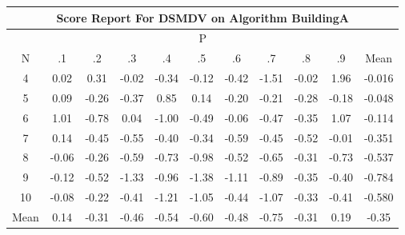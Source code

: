 \documentclass[11pt,a4paper]{report}
\begin{document}
\begin{longtable}{ | c || c | c | c | c | c | c | c | c | c || c |}
\hline
\multicolumn{11}{|c|}{ Score Report For DSMDV on Algorithm BuildingA} \\
\hline
\multicolumn{11}{|c|}{ P } \\
\hline
N & .1 & .2 & .3 & .4 & .5 & .6 & .7 & .8 & .9 & Mean\\
 \hline
 \hline
 \endhead
  4 &  \cellcolor[HTML]{FFFFFF} 0.02 &  \cellcolor[HTML]{F7F7FF} 0.31 &  \cellcolor[HTML]{FFFFFF} -0.02 &  \cellcolor[HTML]{FFF7F7} -0.34 &  \cellcolor[HTML]{FFFFFF} -0.12 &  \cellcolor[HTML]{FFF7F7} -0.42 &  \cellcolor[HTML]{FFD7D7} -1.51 &  \cellcolor[HTML]{FFFFFF} -0.02 &  \cellcolor[HTML]{CFCFFF} 1.96 & -0.016 \\
  5 &  \cellcolor[HTML]{FFFFFF} 0.09 &  \cellcolor[HTML]{FFF7F7} -0.26 &  \cellcolor[HTML]{FFF7F7} -0.37 &  \cellcolor[HTML]{E7E7FF} 0.85 &  \cellcolor[HTML]{FFFFFF} 0.14 &  \cellcolor[HTML]{FFF7F7} -0.20 &  \cellcolor[HTML]{FFF7F7} -0.21 &  \cellcolor[HTML]{FFF7F7} -0.28 &  \cellcolor[HTML]{FFF7F7} -0.18 & -0.048 \\
  6 &  \cellcolor[HTML]{E7E7FF} 1.01 &  \cellcolor[HTML]{FFEFEF} -0.78 &  \cellcolor[HTML]{FFFFFF} 0.04 &  \cellcolor[HTML]{FFE7E7} -1.00 &  \cellcolor[HTML]{FFEFEF} -0.49 &  \cellcolor[HTML]{FFFFFF} -0.06 &  \cellcolor[HTML]{FFF7F7} -0.47 &  \cellcolor[HTML]{FFF7F7} -0.35 &  \cellcolor[HTML]{E7E7FF} 1.07 & -0.114 \\
  7 &  \cellcolor[HTML]{FFFFFF} 0.14 &  \cellcolor[HTML]{FFF7F7} -0.45 &  \cellcolor[HTML]{FFEFEF} -0.55 &  \cellcolor[HTML]{FFF7F7} -0.40 &  \cellcolor[HTML]{FFF7F7} -0.34 &  \cellcolor[HTML]{FFEFEF} -0.59 &  \cellcolor[HTML]{FFF7F7} -0.45 &  \cellcolor[HTML]{FFEFEF} -0.52 &  \cellcolor[HTML]{FFFFFF} -0.01 & -0.351 \\
  8 &  \cellcolor[HTML]{FFFFFF} -0.06 &  \cellcolor[HTML]{FFF7F7} -0.26 &  \cellcolor[HTML]{FFEFEF} -0.59 &  \cellcolor[HTML]{FFEFEF} -0.73 &  \cellcolor[HTML]{FFE7E7} -0.98 &  \cellcolor[HTML]{FFEFEF} -0.52 &  \cellcolor[HTML]{FFEFEF} -0.65 &  \cellcolor[HTML]{FFF7F7} -0.31 &  \cellcolor[HTML]{FFEFEF} -0.73 & -0.537 \\
  9 &  \cellcolor[HTML]{FFFFFF} -0.12 &  \cellcolor[HTML]{FFEFEF} -0.52 &  \cellcolor[HTML]{FFDFDF} -1.33 &  \cellcolor[HTML]{FFE7E7} -0.96 &  \cellcolor[HTML]{FFDFDF} -1.38 &  \cellcolor[HTML]{FFE7E7} -1.11 &  \cellcolor[HTML]{FFE7E7} -0.89 &  \cellcolor[HTML]{FFF7F7} -0.35 &  \cellcolor[HTML]{FFF7F7} -0.40 & -0.784 \\
  10 &  \cellcolor[HTML]{FFFFFF} -0.08 &  \cellcolor[HTML]{FFF7F7} -0.22 &  \cellcolor[HTML]{FFF7F7} -0.41 &  \cellcolor[HTML]{FFDFDF} -1.21 &  \cellcolor[HTML]{FFE7E7} -1.05 &  \cellcolor[HTML]{FFF7F7} -0.44 &  \cellcolor[HTML]{FFE7E7} -1.07 &  \cellcolor[HTML]{FFF7F7} -0.33 &  \cellcolor[HTML]{FFF7F7} -0.41 & -0.580 \\
 \hline
 \hline
Mean &  \cellcolor[HTML]{FFFFFF} 0.14 &  \cellcolor[HTML]{FFF7F7} -0.31 &  \cellcolor[HTML]{FFF7F7} -0.46 &  \cellcolor[HTML]{FFEFEF} -0.54 &  \cellcolor[HTML]{FFEFEF} -0.60 &  \cellcolor[HTML]{FFF7F7} -0.48 &  \cellcolor[HTML]{FFEFEF} -0.75 &  \cellcolor[HTML]{FFF7F7} -0.31 &  \cellcolor[HTML]{F7F7FF} 0.19 &  \cellcolor[HTML]{FFF7F7} -0.35
\end{longtable}
\end{document}
